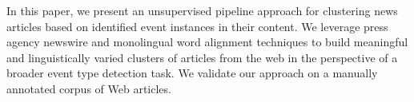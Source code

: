 In this paper, we present an unsupervised pipeline approach for clustering news articles based on identified event instances in their content. We leverage press agency newswire and monolingual word alignment techniques to build meaningful and linguistically varied clusters of articles from the web in the perspective of a broader event type detection task. We validate our approach on a manually annotated corpus of Web articles.
